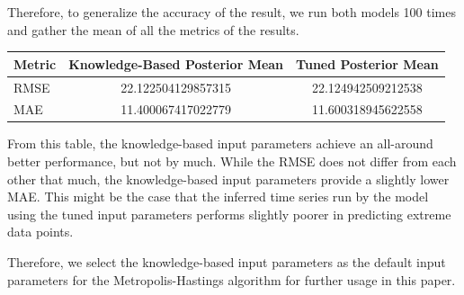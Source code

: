 Therefore, to generalize the accuracy of the result, we run both models 100 times and gather the mean of all the metrics of the results.

\begin{center}
\begin{tabular}{@{}lcc@{}}
\toprule
\textbf{Metric} & \textbf{Knowledge-Based Posterior Mean} & \textbf{Tuned Posterior Mean} \\ \midrule
RMSE            & 22.122504129857315               & 22.124942509212538                  \\
MAE             & 11.400067417022779               & 11.600318945622558              \\ \bottomrule
\end{tabular}
\end{center}




From this table, the knowledge-based input parameters achieve an all-around better performance, but not by much. While the RMSE does not differ from each other that much, the knowledge-based input parameters provide a slightly lower MAE. This might be the case that the inferred time series run by the model using the tuned input parameters performs slightly poorer in predicting extreme data points.

Therefore, we select the knowledge-based input parameters as the default input parameters for the Metropolis-Hastings algorithm for further usage in this paper.



